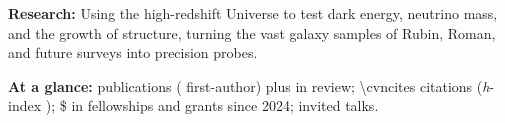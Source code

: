


\textbf{Research:}
Using the high-redshift Universe to test dark energy, neutrino mass, and the growth of structure, turning the vast galaxy samples of Rubin, Roman, and future surveys into precision probes.
\vspace{0.4em}

\textbf{At a glance:}
\cvnpubs{} publications (\cvnfirst{} first-author) plus \cvnreview{} in review; \num{\cvncites} citations (\textit{h}-index \cvhindex);
\$ in fellowships and grants since 2024;
 invited talks.
